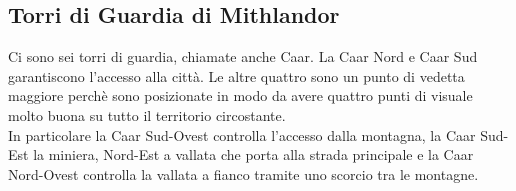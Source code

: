 \subsection{Torri di Guardia di Mithlandor}
Ci sono sei torri di guardia, chiamate anche Caar. La Caar Nord e Caar Sud garantiscono l'accesso alla citt\`a. Le altre quattro sono un punto di vedetta maggiore perch\`e sono posizionate in modo da avere quattro punti di visuale molto buona su tutto il territorio circostante.\\
In particolare la Caar Sud-Ovest controlla l'accesso dalla montagna, la Caar Sud-Est la miniera, Nord-Est a vallata che porta alla strada principale e la Caar Nord-Ovest controlla la vallata a fianco tramite uno scorcio tra le montagne.\\
